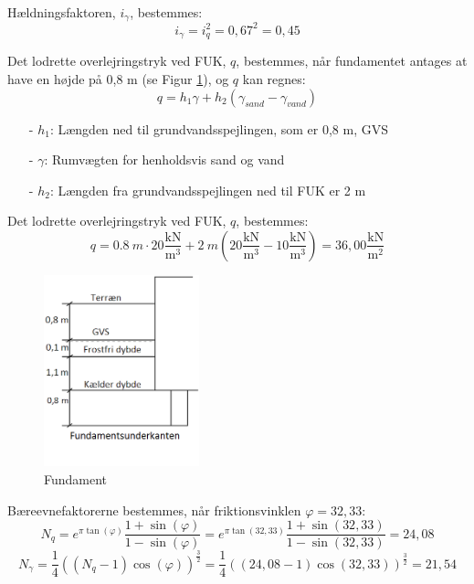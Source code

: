 Hældningsfaktoren, $i_{\gamma}$, bestemmes:
\begin{equation}
	i_{\gamma} = i_q^2 = 0,\!67^2 = 0,\!45
\end{equation}

Det lodrette overlejringstryk ved FUK, $q$, bestemmes, når fundamentet antages at have en højde på 0,8 m (se Figur \ref{fig:hihi}), og $q$ kan regnes:
\begin{equation}
	q = h_1 \gamma + h_2 (\gamma_{sand} - \gamma_{vand})
\end{equation}

\begin{itemize}
	\item[-] $h_1$: Længden ned til grundvandsspejlingen, som er 0,8 m, GVS
	\item[-] $\gamma$: Rumvægten for henholdsvis sand og vand
	\item[-] $h_2$: Længden fra grundvandsspejlingen ned til FUK er 2 m
\end{itemize}

Det lodrette overlejringstryk ved FUK, $q$, bestemmes:
\begin{equation}
	q = \SI{0,8}{m} \cdot 20\frac{\text{kN}}{\text{m}^3} + \SI{2}{m} (20\frac{\text{kN}}{\text{m}^3} - 10\frac{\text{kN}}{\text{m}^3}) = 36,\!00 \frac{\text{kN}}{\text{m}^2}
\end{equation}

\begin{figure}[htbp]
	\centering
	\includegraphics[width=0.4\textwidth]{billeder/fundamentsdybde.png}
	\caption{Fundament}
	\label{fig:hihi}
\end{figure}

Bæreevnefaktorerne bestemmes, når friktionsvinklen $\varphi = 32,\!33$:
\begin{equation}
	N_q = e^{\pi \tan(\varphi)} \frac{1 + \sin(\varphi)}{1 - \sin(\varphi)} = e^{\pi \tan(32,\!33)} \frac{1 + \sin(32,\!33)}{1 - \sin(32,\!33)} = 24,\!08
\end{equation}
\begin{equation}
	N_\gamma = \frac{1}{4}((N_q - 1)\cos(\varphi))^\frac{3}{2} = \frac{1}{4}((24,\!08 - 1)\cos(32,\!33))^\frac{3}{2}=21,\!54
\end{equation}

